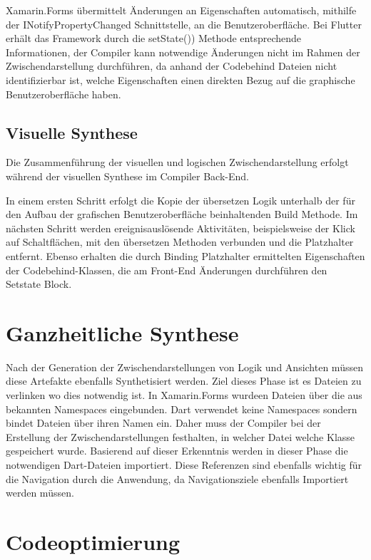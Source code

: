  Xamarin.Forms übermittelt Änderungen an  Eigenschaften automatisch, mithilfe der
\glq INotifyPropertyChanged\grq{}  Schnittstelle, an die Benutzeroberfläche.  Bei Flutter erhält das Framework durch die \glq setState())\grq{}  Methode entsprechende Informationen,  der Compiler kann notwendige Änderungen nicht im Rahmen der Zwischendarstellung durchführen, da anhand der Codebehind Dateien nicht identifizierbar ist, welche Eigenschaften einen direkten Bezug auf die graphische Benutzeroberfläche haben.

\subsection{Visuelle Synthese}

Die Zusammenführung der visuellen und logischen Zwischendarstellung erfolgt während der visuellen Synthese im Compiler Back-End.  

In einem ersten Schritt erfolgt die Kopie der übersetzen Logik unterhalb der für den Aufbau der grafischen Benutzeroberfläche beinhaltenden Build Methode.  Im nächsten Schritt werden ereignisauslösende Aktivitäten,  beispielsweise der Klick auf Schaltflächen,  mit den übersetzen Methoden verbunden und die Platzhalter entfernt.  
Ebenso erhalten die durch Binding Platzhalter ermittelten Eigenschaften der Codebehind-Klassen, die am Front-End Änderungen durchführen den Setstate Block.

\section{Ganzheitliche Synthese}
Nach der Generation der Zwischendarstellungen von Logik und Ansichten müssen diese Artefakte ebenfalls Synthetisiert werden.  Ziel dieses Phase ist es Dateien zu verlinken wo dies notwendig ist.  In Xamarin.Forms wurdeen Dateien über die aus  \Csharp bekannten Namespaces eingebunden.  Dart verwendet keine Namespaces sondern bindet Dateien über ihren Namen ein.  Daher muss der Compiler bei der Erstellung der Zwischendarstellungen festhalten,  in welcher Datei welche Klasse gespeichert wurde.   Basierend auf dieser Erkenntnis werden in dieser Phase die notwendigen Dart-Dateien importiert.  Diese Referenzen sind ebenfalls wichtig für die Navigation durch die Anwendung,  da Navigationsziele ebenfalls Importiert werden müssen. 


\section{Codeoptimierung}

